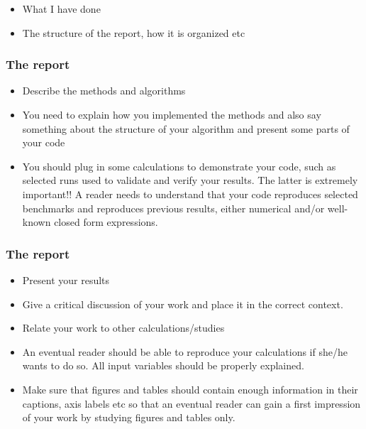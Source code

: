 \documentclass[handout]{beamer}
\newenvironment{block_mdfboxadmon}[1][]{\begin{block}{#1}}{\end{block}}
\begin{document}
\begin{frame}
\begin{block_mdfboxadmon}
\begin{itemize}
 \item What I have done

 \item The structure of the report, how it is organized etc
\end{itemize}

\noindent
\end{block_mdfboxadmon}
\end{frame}

\begin{frame}
\frametitle{The report}

\begin{block_mdfboxadmon}
\begin{itemize}
 \item Describe the methods and algorithms

 \item You need to explain how you implemented the methods and also say something about the structure of your algorithm and present some parts of your code

 \item You should plug in some calculations to demonstrate your code, such as selected runs used to validate and verify your results. The latter is extremely important!!  A reader needs to understand that your code reproduces selected benchmarks and reproduces previous results, either numerical and/or well-known  closed form expressions.
\end{itemize}

\noindent
\end{block_mdfboxadmon}
\end{frame}

\begin{frame}
\frametitle{The report}

\begin{block_mdfboxadmon}
\begin{itemize}
 \item Present your results

 \item Give a critical discussion of your work and place it in the correct context.

 \item Relate your work to other calculations/studies

 \item An eventual reader should be able to reproduce your calculations if she/he wants to do so. All input variables should be properly explained.

 \item Make sure that figures and tables should contain enough information in their captions, axis labels etc so that an eventual reader can gain a first impression of your work by studying figures and tables only.
\end{itemize}

\noindent
\end{block_mdfboxadmon}
\end{frame}
\end{document}
